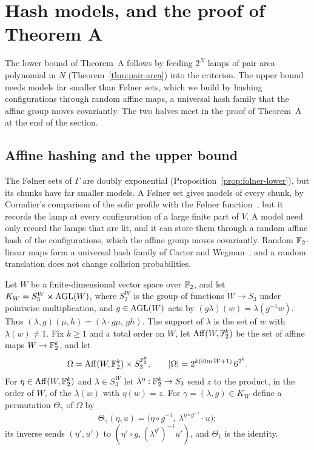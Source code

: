 \section{Hash models, and the proof of Theorem A}\label{sec:profile}

The lower bound of Theorem~A follows by feeding $2^N$ lamps of pair area polynomial in $N$ (Theorem~\ref{thm:pair-area}) into the criterion.
The upper bound needs models far smaller than Følner sets, which we build by hashing configurations through random affine maps, a universal
hash family that the affine group moves covariantly. The two halves meet in the proof of Theorem~A at the end of the section.

\subsection{Affine hashing and the upper bound}\label{sec:hashing}

The Følner sets of $\Gamma$ are doubly exponential (Proposition~\ref{prop:folner-lower}), but its chunks have far smaller models. A Følner set
gives models of every chunk, by Cornulier's comparison of the sofic profile with the Følner function~\cite[Proposition~3.14]{Cornulier2013}, but
it records the lamp at every configuration of a large finite part of $V$. A model need only record the lamps that are lit, and it can store them
through a random affine hash of the configurations, which the affine group moves covariantly. Random $\mathbb F_2$-linear maps form a universal
hash family of Carter and Wegman~\cite{CarterWegman1979}, and a random translation does not change collision probabilities.

Let $W$ be a finite-dimensional vector space over $\mathbb F_2$, and let $K_W=S_3^W\rtimes\operatorname{AGL}(W)$, where $S_3^W$ is the group of functions
$W\to S_3$ under pointwise multiplication, and $g\in\operatorname{AGL}(W)$ acts by $(g\lambda)(w)=\lambda(g^{-1}w)$. Thus $(\lambda,g)(\mu,h)=(\lambda\cdot g\mu,\,gh)$.
The support of $\lambda$ is the set of $w$ with $\lambda(w)\ne1$. Fix $k\ge1$ and a total order on $W$, let $\operatorname{Aff}(W,\mathbb F_2^k)$ be the
set of affine maps $W\to\mathbb F_2^k$, and let
\[
\Omega=\operatorname{Aff}(W,\mathbb F_2^k)\times S_3^{\mathbb F_2^k},\qquad |\Omega|=2^{k(\dim W+1)}\,6^{2^k}.
\]
For $\eta\in\operatorname{Aff}(W,\mathbb F_2^k)$ and $\lambda\in S_3^W$ let $\lambda^\eta:\mathbb F_2^k\to S_3$ send $z$ to the product, in the order of $W$, of the
$\lambda(w)$ with $\eta(w)=z$. For $\gamma=(\lambda,g)\in K_W$ define a permutation $\Theta_\gamma$ of $\Omega$ by
\[
\Theta_\gamma(\eta,u)=\bigl(\eta\circ g^{-1},\ \lambda^{\eta\circ g^{-1}}\cdot u\bigr);
\]
its inverse sends $(\eta',u')$ to $(\eta'\circ g,(\lambda^{\eta'})^{-1}u')$, and $\Theta_1$ is the identity.

